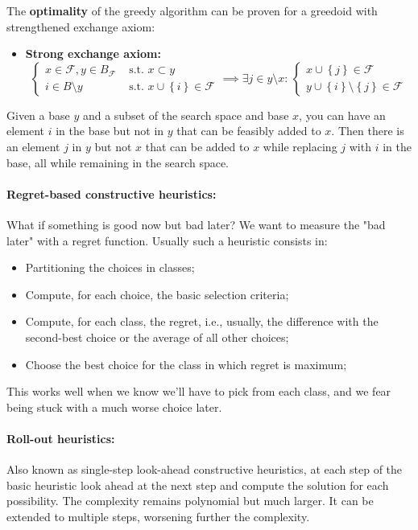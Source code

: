 \documentclass{article}
\begin{document}
	The \textbf{optimality} of the greedy algorithm can be proven for a greedoid with strengthened exchange axiom: 
	\begin{itemize}
		\item \textbf{Strong exchange axiom:}
		$$ 
		\begin{cases}
			x \in \mathcal{F}, y \in B_{\mathcal{F}} & \text{ s.t. } x \subset y \\
			i \in B \setminus y & \text{ s.t. } x \cup \left\{i\right\} \in \mathcal{F}
		\end{cases}
		\implies \exists j \in y \setminus x: \, 
		\begin{cases}
			x \cup \left\{j\right\} \in \mathcal{F} \\
			y \cup \left\{i\right\} \setminus \left\{j\right\} \in \mathcal{F}
		\end{cases}
		$$
	\end{itemize}
	Given a base $y$ and a subset of the search space and base $x$, you can have an element $i$ in the base but not in $y$ that can be feasibly added to $x$. Then there is an element $j$ in $y$ but not $x$ that can be added to $x$ while replacing $j$ with $i$ in the base, all while remaining in the search space.\\
	
	\paragraph{Regret-based constructive heuristics:} What if something is good now but bad later? We want to measure the "bad later" with a regret function. Usually such a heuristic consists in:
	\begin{itemize}
		\item Partitioning the choices in classes;
		\item Compute, for each choice, the basic selection criteria;
		\item Compute, for each class, the regret, i.e., usually, the difference with the second-best choice or the average of all other choices;
		\item Choose the best choice for the class in which regret is maximum;
	\end{itemize}
	This works well when we know we'll have to pick from each class, and we fear being stuck with a much worse choice later.\\
	
	\paragraph{Roll-out heuristics:} Also known as single-step look-ahead constructive heuristics, at each step of the basic heuristic look ahead at the next step and compute the solution for each possibility. The complexity remains polynomial but much larger. It can be extended to multiple steps, worsening further the complexity.\\
	
\end{document}
